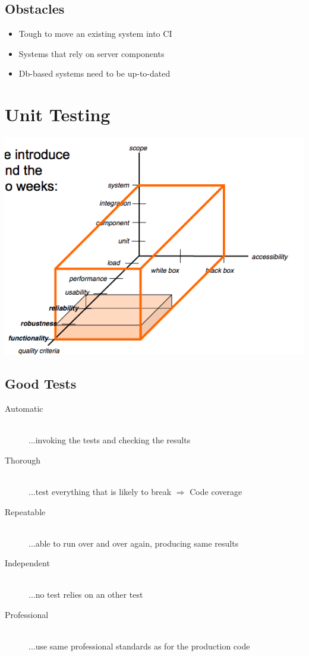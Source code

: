 \documentclass[a4paper,10pt]{article}
\newcommand{\Ra}{\Rightarrow}
\begin{document}
\subsection{Obstacles}
\begin{itemize}
	\item Tough to move an existing system into CI
	\item Systems that rely on server components
	\item Db-based systems need to be up-to-dated
\end{itemize}

\newpage
\section{Unit Testing}
\includegraphics[scale=0.6]{unit_testing.png}

\subsection{Good Tests}
\begin{description}
	\item[Automatic] \hfill \\ ...invoking the tests and checking the results
	\item[Thorough] \hfill \\ ...test everything that is likely to break $\Ra$ Code coverage
	\item[Repeatable] \hfill \\ ...able to run over and over again, producing same results
	\item[Independent] \hfill \\  ...no test relies on an other test
	\item[Professional] \hfill \\ ...use same professional standards as for the production code
\end{description}
\end{document}
